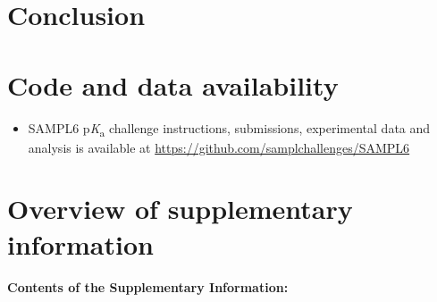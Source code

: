 \documentclass[9pt,lineno,final]{elife}
\newcommand{\pKa}{p\textit{K}\textsubscript{a}}
\begin{document}














\section{Conclusion}


\section{Code and data availability}
\begin{minipage}{15cm}
\begin{itemize}

\item SAMPL6 \pKa{} challenge instructions, submissions, experimental data and analysis is available at  \href{https://github.com/samplchallenges/SAMPL6}{https://github.com/samplchallenges/SAMPL6}

\end{itemize}
\end{minipage}


\section{Overview of supplementary information}

\paragraph{Contents of the Supplementary Information:}
\end{document}
